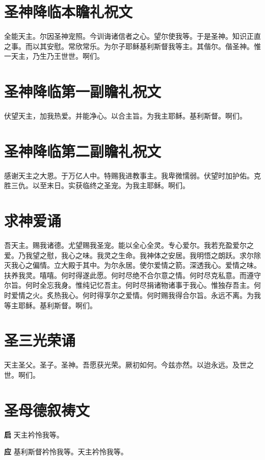 \documentclass[UTF8,17pt]{ctexart}
\begin{document}
\section{圣神降临本瞻礼祝⽂}

全能天主。尔因圣神宠照。今训诲诸信者之⼼。望尔使我等。于是圣神。知识正直之事。⽽以其安慰。常欣常乐。为尔⼦耶稣基利斯督我等主。其偕尔。偕圣神。惟⼀天主，乃⽣乃王世世。啊们。

\section{圣神降临第⼀副瞻礼祝⽂}

伏望天主，加我热爱。并能净⼼。以合主旨。为我主耶稣。基利斯督。啊们。

\section{圣神降临第⼆副瞻礼祝⽂}

感谢天主之⼤恩。于万亿⼈中。特赐我进教事主。我卑微懦弱。伏望时加护佑。克胜三仇。以⾄末⽇。实获临终之圣宠。为我主耶稣。啊们。

\section{求神爱诵}

吾天主。赐我诸德。尤望赐我圣宠。能以全⼼全灵。专⼼爱尔。我若充盈爱尔之爱。乃我望之慰，我⼼之味。我灵之⽣命。我神体之安居。我明悟之朗跃。求尔除灭我⼼之偏情。⽴⼤殿于其中。为尔永居。使尔爱情之箭。深透我⼼。爱情之味。扶养我灵。嘻嘻。何时得遂此愿。何时尽绝不合尔意之情。何时尽克私意。⽽遵守尔旨。何时全忘我⾝。惟纯记忆吾主。何时尽捐诸物诸事于我⼼。惟独存吾主。何时爱情之⽕。炙热我⼼。何时得享尔之爱情。何时赐我得合尔旨。永远不离。为我等主耶稣。基利斯督。啊们。

\section{圣三光荣诵}

天主圣⽗。圣⼦。圣神。吾愿获光荣。厥初如何。今兹亦然。以迨永远。及世之世。啊们。

\section{圣母德叙祷⽂}

\textbf{启} \quad 天主衿怜我等。

\textbf{应} \quad 基利斯督衿怜我等。天主衿怜我等。
\end{document}
